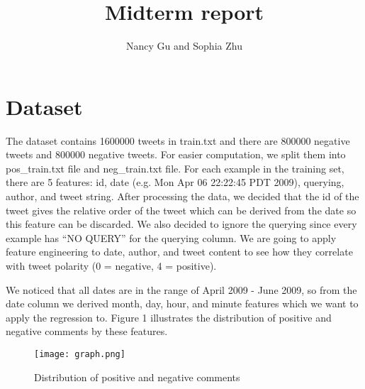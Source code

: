 \documentclass[a4paper]{article}
\title{Midterm report}
\author{Nancy Gu and Sophia Zhu}
\begin{document}
\maketitle

\section{Dataset}

\begin{flushleft}
The dataset contains 1600000 tweets in train.txt and there are 800000 negative tweets and 800000 negative tweets. For easier computation, we split them into pos\_train.txt file and neg\_train.txt file. For each example in the training set, there are 5 features: id,  date (e.g. Mon Apr 06 22:22:45 PDT 2009), querying, author, and tweet string. After processing the data, we decided that the id of the tweet gives the relative order of the tweet which can be derived from the date so this feature can be discarded. We also decided to ignore the querying since every example has “NO QUERY” for the querying column. We are going to apply feature engineering to date, author, and tweet content to see how they correlate with tweet polarity (0 = negative, 4 = positive).
\end{flushleft}
\begin{flushleft}
We noticed that all dates are in the range of April 2009 - June 2009, so from the date column we derived month, day, hour, and minute features which we want to apply the regression to. Figure 1 illustrates the distribution of positive and negative comments by these features.
\end{flushleft}
\begin{figure}
\centering
\texttt{[image: graph.png]}
\caption{Distribution of positive and negative comments}
\end{figure}
\end{document}
